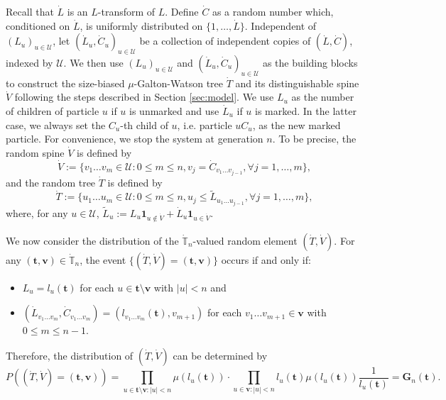 \documentclass[12pt,a4paper]{amsart}
\numberwithin{equation}{section}
\begin{document}
	Recall that $\dot L$ is an $L$-transform of $L$.
	Define $\dot C$ as a random number which, conditioned on $\dot L$, is uniformly distributed on $\{1,\dots,\dot L\}$.
	Independent of $(L_u)_{u\in\mathcal U}$, let $(\dot L_u,\dot C_u)_{u\in \mathcal U}$ be a collection of independent copies of $(\dot L,\dot C)$, indexed by $\mathcal U$.
	We then use $(L_u)_{u\in\mathcal U}$ and $(\dot L_u,\dot C_u)_{u\in\mathcal U}$ as the building blocks to construct the size-biased $\mu$-Galton-Watson tree $\dot T$ and its distinguishable spine $\dot V$ following the steps described in Section \ref{sec:model}.
	We use $L_u$ as the number of children of particle $u$ if $u$ is unmarked and use $\dot L_u$ if $u$ is marked.
	In the latter case, we always set the $C_u$-th child of $u$, i.e. particle $uC_u$, as the new marked particle.
	For convenience, we stop the system at generation $n$. To be precise, the random spine $\dot V$ is defined by
\begin{equation*}
		\dot V
	:=\{v_1\dots v_m\in \mathcal U:0\le m\le n, v_j=\dot C_{v_1\dots v_{j-1}},\forall j=1,\dots,m\},
\end{equation*}
	and the random tree $\dot T$ is defined by
\begin{equation*}
		\dot T
	:=\{u_1\dots u_m\in\mathcal U: 0\le m\le n,u_j\leq \tilde L_{u_1\dots u_{j-1}},\forall j=1,\dots,m\},
\end{equation*}
	where, for any $u\in\mathcal U$, $\tilde L_u:=L_u\mathbf 1_{u\not\in \dot V}+\dot L_u\mathbf 1_{u\in \dot V}$.

	We now consider the distribution of the $\dot{\mathbb T}_n$-valued random element $(\dot T,\dot V)$.
	For any $( \mathbf t , \mathbf v)\in\dot{\mathbb T}_n$, the event $\{(\dot T,\dot V)=( \mathbf t , \mathbf v)\}$ occurs if and only if:
\begin{itemize}
\item
    $L_u=l_u( \mathbf t )$ for each $u\in  \mathbf t \setminus \mathbf v$ with $| u |<n$ and
\item
	$(\dot L_{v_1\dots v_m},\dot C_{v_1\dots v_m})=(l_{v_1\dots v_m}( \mathbf t ),v_{m+1})$ for each $v_1\dots v_{m+1}\in \mathbf v$ with $0\le m\le n-1$.
\end{itemize}
    Therefore, the distribution of $(\dot T,\dot V)$ can be determined by
\begin{equation}
\label{eq:treespinemeasure}
		P((\dot T,\dot V)=( \mathbf t , \mathbf v))
	=\prod_{u\in  \mathbf t \setminus \mathbf v:|u|<n}\mu(l_u( \mathbf t ))
	\cdot \prod_{u\in  \mathbf v:| u| <n}l_u( \mathbf t )\mu(l_u( \mathbf t ))\frac{1}{l_u( \mathbf t )}
	= \mathbf G_n( \mathbf t ).
\end{equation}
	
\end{document}
